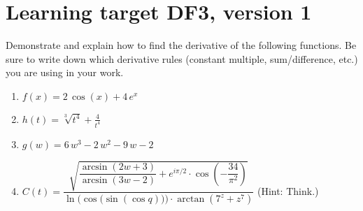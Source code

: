 \section{Learning target DF3, version 1}
\providecommand{\stxKnowl}{}\renewcommand{\stxKnowl}[1]{#1}
\providecommand{\stxOuttro}{}\renewcommand{\stxOuttro}[1]{#1}
\providecommand{\stxTitle}{}\renewcommand{\stxTitle}[1]{#1}
\renewcommand{\stxOuttro}[1]{}
\stxKnowl{
 Demonstrate and explain how to find the derivative of the following functions. Be sure to write down which derivative rules (constant multiple, sum/difference, etc.) you are using in your work.

\begin{enumerate}
\item
\stxKnowl{
 \(f(x) = 2 \, \cos\left(x\right) + 4 \, e^{x}\) 

\stxOuttro{
 \[f'(x) = 4 \, e^{x} - 2 \, \sin\left(x\right)\] 

}
}
\vfill 
\item
\stxKnowl{
 \(h(t) = \sqrt[3]{t^4} + \frac{4}{t^{4}}\)

\stxOuttro{
 \[h'(t) = \frac{4}{3} \, t^{\frac{1}{3}} - \frac{16}{t^{5}}\] 

}
}
\vfill 
\item
\stxKnowl{
 \(g(w) = 6 \, w^{3} - 2 \, w^{2} - 9 \, w - 2\)

\stxOuttro{
 \[g'(w) = 18 \, w^{2} - 4 \, w - 9\] 

}
}
\vfill 
\item 
\stxKnowl{
 \(C(t) = \dfrac{\sqrt{\dfrac{\arcsin(2w+3)}{\arcsin(3w-2)} + 
                 e^{i \pi/2}\cdot \cos\left(-\dfrac{34}{\pi^2}\right)}}
                {\ln\Big(\cos\big(\sin(\cos q)\big)\Big) \cdot
                \arctan(7^z+z^7)}\) \quad
(Hint: Think.)

\stxOuttro{
 The variable is $t$, so this is a constant function.

}
}
\end{enumerate}
}

\pagebreak

